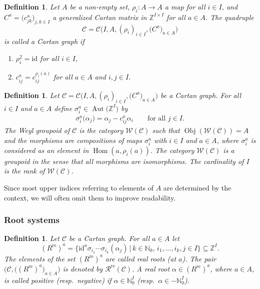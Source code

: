 \documentclass[10pt,a4paper]{amsart}
\numberwithin{equation}{section}
\newtheorem{Definition}[Theorem]{Definition}
\newcommand{\NN }{\mathbb{N}}
\newcommand{\ZZ }{\mathbb{Z}}
\newcommand{\id }{\mathrm{id}}
\DeclareMathOperator{\Aut}{Aut}
\DeclareMathOperator{\Hom}{Hom}
\newcommand{\Cc }{\mathcal{C}}
\newcommand{\Wg }{\mathcal{W}}
\newcommand{\rsC }{\mathcal{R}}
\newcommand{\re }{^\mathrm{re}}
\newcommand{\rer }[1]{(R\re)^{#1}}
\DeclareMathOperator{\Obj}{Obj}
\begin{document}
\begin{Definition}
Let $A$ be a non-empty set, $\rho_i\colon A \to A$ a map for all $i\in I$, and $C^a=\big(c^a_{jk}\big)_{j,k \in I}$ a generalized Cartan matrix in $\ZZ ^{I \times I}$ for all $a\in A$. The quadruple
\[ \Cc = \Cc \big(I,A,(\rho_i)_{i \in I}, \big(C ^a\big)_{a \in A}\big) \]
is called a {\it Cartan graph} if
\begin{enumerate}\itemsep=0pt
\item[(C1)] $\rho_i^2 = \id$ for all $i \in I$,
\item[(C2)] $c^a_{ij} = c^{\rho_i(a)}_{ij}$ for all $a\in A$ and $i,j\in I$.
\end{enumerate}
\end{Definition}

\begin{Definition}
Let $\Cc = \Cc \big(I,A,(\rho_i)_{i \in I}, \big(C ^a\big)_{a \in A}\big)$ be a Cartan graph.
For all $i \in I$ and $a \in A$ define $\sigma _i^a \in \Aut\big(\ZZ ^I\big)$ by
\begin{align*}
\sigma _i^a \big(\alpha_j\big) = \alpha_j - c_{ij}^a \alpha_i \qquad
\text{for all $j \in I$.}
\end{align*}
The {\it Weyl groupoid of} $\Cc $ is the category $\Wg (\Cc )$ such that $\Obj(\Wg (\Cc ))=A$ and
the morphisms are compositions of maps $\sigma _i^a$ with $i\in I$ and $a\in A$,
where $\sigma _i^a$ is considered as an element in $\Hom (a,\rho_i(a))$.
The category $\Wg (\Cc )$ is a groupoid in the sense that all morphisms are isomorphisms.
The cardinality of $I$ is the {\it rank of} $\Wg (\Cc )$.
\end{Definition}

Since most upper indices referring to elements of $A$ are determined by the context, we will often omit them to improve readability.

\subsubsection{Root systems}

\begin{Definition}
Let $\Cc $ be a Cartan graph. For all $a\in A$ let
\[ \rer a=\big\{ \id ^a \sigma _{i_1}\cdots \sigma_{i_k}(\alpha_j)\,|\,
k\in \NN _0,\,i_1,\dots,i_k,j\in I\big\}\subseteq \ZZ ^I.\]
The elements of the set $\rer a$ are called {\it real roots} (at $a$).
The pair $\big(\Cc ,\big(\rer a\big)_{a\in A}\big)$ is denoted by $\rsC \re (\Cc )$.
A real root $\alpha\in \rer a$, where $a\in A$, is called positive
(resp.\ negative) if $\alpha\in \NN _0^I$ (resp.\ $\alpha\in -\NN _0^I$).
\end{Definition}
\end{document}
